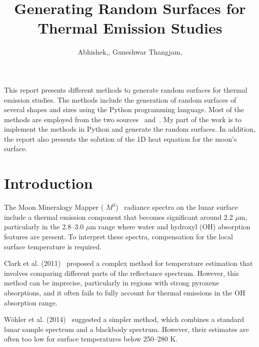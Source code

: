 \documentclass{optica-article}
\begin{document}
\title{Generating Random Surfaces for Thermal Emission Studies}



\author{Abhishek,, Guneshwar Thangjam,}

\address{National Institute of Science Education and Research, Jatni, Khordha 752050, Odisha, India}



\begin{abstract*}
	This report presents different methods to generate random surfaces for 
	thermal emission studies. The methods include the generation of random surfaces of several shapes
	and sizes using the Python programming language. Most of the methods are employed from the two sources~\cite{WOHLER2017118}
	and~\cite{DAVIDSSON20151}. My part of the work is to implement the methods in Python and 
	generate the random surfaces. In addition, the report also presents the solution of the 1D heat equation for the moon's surface.
	
\end{abstract*}

\section{Introduction}

The Moon Mineralogy Mapper ( $M^{3}$)~\cite{chandrayaan1} radiance spectra on the lunar surface include a thermal emission component 
that becomes significant around 2.2 $\mu$m, particularly in the 2.8–3.0 $\mu$m 
range where water and hydroxyl (OH) absorption features are present. 
To interpret these spectra, compensation for the local surface temperature is 
required.

Clark et al. (2011)~\cite{clark_thermal_2011} proposed a complex method for temperature estimation that 
involves comparing different parts of the reflectance spectrum. However, 
this method can be imprecise, particularly in regions with strong pyroxene 
absorptions, and it often fails to fully account for thermal emissions in the 
OH absorption range.

Wöhler et al. (2014)~\cite{WOHLER201486} suggested a simpler method, which combines a standard 
lunar sample spectrum and a blackbody spectrum. However, their estimates are 
often too low for surface temperatures below 250–280 K.
\end{document}
